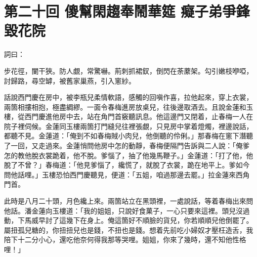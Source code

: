 
\chapter*{第二十回 傻幫閑趨奉鬧華筵 癡子弟爭鋒毀花院}


詞曰：

\begin{myquote} 
步花徑，闌干狹。防人覷，常驚嚇。荊刺抓裙釵，倒閃在荼䕷架。勾引嫩枝咿啞，討歸路，尋空罅，被舊家巢燕，引入窻紗。

\end{myquote} 

話說西門慶在房中，被李瓶兒柔情軟語，{}感觸的回嗔作喜，拉他起來，穿上衣裳，兩箇相摟相抱，極盡綢繆。一面令春梅進房放桌兒，往後邊取酒去。且說金蓮和玉樓，從西門慶進他房中去，站在角門首竅聽訊息。他這邊門又閉着，止春梅一人在院子裡伺候。金蓮同玉樓兩箇打門縫兒往裡張覷，只見房中掌着燈燭，裡邊說話，都聽不見。金蓮道：「俺到不如春梅賊小肉兒，他倒聽的伶俐。」那春梅在窻下潛聽了一回，又走過來。金蓮悄問他房中怎的動靜，春梅便隔門告訴與二人說：「俺爹怎的教他脫衣裳跪着，他不脫。爹惱了，抽了他幾馬鞭子。」金蓮道：「打了他，他脫了不曾？」春梅道：「他見爹惱了，纔慌了，就脫了衣裳，跪在地平上。爹如今問他話哩。」玉樓恐怕西門慶聽見，便道：「五姐，咱過那邊去罷。」{}拉金蓮來西角門首。

此時是八月二十頭，月色纔上來。兩箇站立在黑頭裡，一處說話，等着春梅出來問他話。潘金蓮向玉樓道：「我的姐姐，只說好食菓子，一心只要來這裡。頭兒沒過動，下馬威早討了這幾下在身上。俺這箇好不順臉的貨兒，你若順順兒他倒罷了。屬扭孤兒糖的，你扭扭兒也是錢，不扭也是錢。想着先前吃小婦奴才壓枉造舌，我陪下十二分小心，還吃他奈何得我那等哭哩。姐姐，你來了幾時，還不知他性格哩！」

